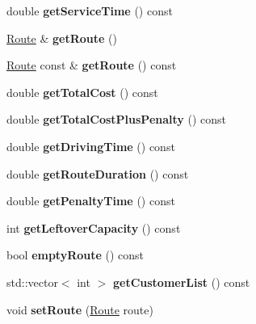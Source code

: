 \begin{DoxyCompactItemize}
\mbox{\label{class_vehicle_ac3f306380304c8f87e741f96ee35c563}} 
double {\bfseries get\+Service\+Time} () const
\item 
\mbox{\label{class_vehicle_a53ff209740804a59014c90eff4a4a386}} 
\hyperlink{class_route}{Route} \& {\bfseries get\+Route} ()
\item 
\mbox{\label{class_vehicle_a0c5a76433d16b806fe5abdcfc8ffeb22}} 
\hyperlink{class_route}{Route} const  \& {\bfseries get\+Route} () const
\item 
\mbox{\label{class_vehicle_a83d25c44fc48f4affd6d83bab54f98f0}} 
double {\bfseries get\+Total\+Cost} () const
\item 
\mbox{\label{class_vehicle_a57dd3fc27076f460d4cac3b750aeb011}} 
double {\bfseries get\+Total\+Cost\+Plus\+Penalty} () const
\item 
\mbox{\label{class_vehicle_a6bda1a96e5899e343ca77250bd981ce2}} 
double {\bfseries get\+Driving\+Time} () const
\item 
\mbox{\label{class_vehicle_a5b63ad191aa37fb3e66cec0c9b0b3b0f}} 
double {\bfseries get\+Route\+Duration} () const
\item 
\mbox{\label{class_vehicle_aa0406e5066d59ee8921e6f8871cbecd7}} 
double {\bfseries get\+Penalty\+Time} () const
\item 
\mbox{\label{class_vehicle_afd53834ae8fc6fea1a972a864b939a36}} 
int {\bfseries get\+Leftover\+Capacity} () const
\item 
\mbox{\label{class_vehicle_ac6bd9e1d4e12dae417a39f2b2f0095cc}} 
bool {\bfseries empty\+Route} () const
\item 
\mbox{\label{class_vehicle_a57563afe2a3e1c6da5823a0a9a9f45dd}} 
std\+::vector$<$ int $>$ {\bfseries get\+Customer\+List} () const
\item 
\mbox{\label{class_vehicle_adc355690a822465f0ef1f715a2e4d7f4}} 
void {\bfseries set\+Route} (\hyperlink{class_route}{Route} route)

\end{DoxyCompactItemize}

